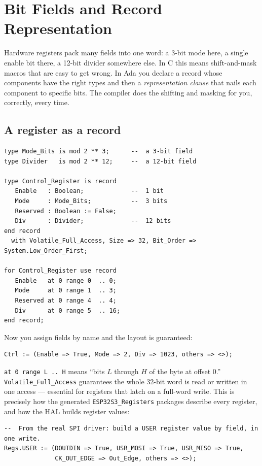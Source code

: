 \section{Bit Fields and Record Representation}
\label{ch:bitfields}

Hardware registers pack many fields into one word: a 3-bit mode here, a single
enable bit there, a 12-bit divider somewhere else. In C this means shift-and-mask
macros that are easy to get wrong. In Ada you declare a record whose components
have the right types and then a \emph{representation clause} that nails each
component to specific bits. The compiler does the shifting and masking for you,
correctly, every time.

\subsection{A register as a record}

\begin{lstlisting}
type Mode_Bits is mod 2 ** 3;      --  a 3-bit field
type Divider   is mod 2 ** 12;     --  a 12-bit field

type Control_Register is record
   Enable   : Boolean;             --  1 bit
   Mode     : Mode_Bits;           --  3 bits
   Reserved : Boolean := False;
   Div      : Divider;             --  12 bits
end record
  with Volatile_Full_Access, Size => 32, Bit_Order => System.Low_Order_First;

for Control_Register use record
   Enable   at 0 range 0  .. 0;
   Mode     at 0 range 1  .. 3;
   Reserved at 0 range 4  .. 4;
   Div      at 0 range 5  .. 16;
end record;
\end{lstlisting}

Now you assign fields by name and the layout is guaranteed:

\begin{lstlisting}
Ctrl := (Enable => True, Mode => 2, Div => 1023, others => <>);
\end{lstlisting}

\texttt{at 0 range L\,..\,H} means ``bits $L$ through $H$ of the byte at offset
0.'' \texttt{Volatile\_Full\_Access} guarantees the whole 32-bit word is read or
written in one access --- essential for registers that latch on a full-word
write. This is precisely how the generated \texttt{ESP32S3\_Registers} packages
describe every register, and how the HAL builds register values:

\begin{lstlisting}
--  From the real SPI driver: build a USER register value by field, in one write.
Regs.USER := (DOUTDIN => True, USR_MOSI => True, USR_MISO => True,
              CK_OUT_EDGE => Out_Edge, others => <>);
\end{lstlisting}

